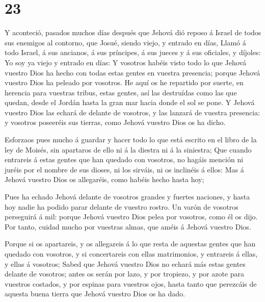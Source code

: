 \hypertarget{section-22}{%
\section{23}\label{section-22}}

 Y aconteció, pasados muchos días después que Jehová dió
reposo á Israel de todos sus enemigos al contorno, que Josué, siendo
viejo, y entrado en días,  Llamó á todo Israel, á sus
ancianos, á sus príncipes, á sus jueces y á sus oficiales, y díjoles: Yo
soy ya viejo y entrado en días:  Y vosotros habéis visto
todo lo que Jehová vuestro Dios ha hecho con todas estas gentes en
vuestra presencia; porque Jehová vuestro Dios ha peleado por vosotros.
 He aquí os he repartido por suerte, en herencia para
vuestras tribus, estas gentes, así las destruídas como las que quedan,
desde el Jordán hasta la gran mar hacia donde el sol se pone.
 Y Jehová vuestro Dios las echará de delante de vosotros, y
las lanzará de vuestra presencia: y vosotros poseeréis sus tierras, como
Jehová vuestro Dios os ha dicho.

 Esforzaos pues mucho á guardar y hacer todo lo que está
escrito en el libro de la ley de Moisés, sin apartaros de ello ni á la
diestra ni á la siniestra;  Que cuando entrareis á estas
gentes que han quedado con vosotros, no hagáis mención ni juréis por el
nombre de sus dioses, ni los sirváis, ni os inclinéis á ellos:
 Mas á Jehová vuestro Dios os allegaréis, como habéis hecho
hasta hoy;

 Pues ha echado Jehová delante de vosotros grandes y fuertes
naciones, y hasta hoy nadie ha podido parar delante de vuestro rostro.
 Un varón de vosotros perseguirá á mil: porque Jehová
vuestro Dios pelea por vosotros, como él os dijo.  Por
tanto, cuidad mucho por vuestras almas, que améis á Jehová vuestro Dios.

 Porque si os apartareis, y os allegareis á lo que resta de
aquestas gentes que han quedado con vosotros, y si concertareis con
ellas matrimonios, y entrareis á ellas, y ellas á vosotros;
 Sabed que Jehová vuestro Dios no echará más estas gentes
delante de vosotros; antes os serán por lazo, y por tropiezo, y por
azote para vuestros costados, y por espinas para vuestros ojos, hasta
tanto que perezcáis de aquesta buena tierra que Jehová vuestro Dios os
ha dado.

